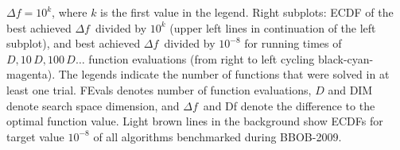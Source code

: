 \documentclass{sig-alternate}
\newcommand{\Df}{\ensuremath{\Delta f}}
\begin{document}
\begin{figure*}
{ $\Df=10^{k}$, where $k$ is the first value in the legend. Right subplots: ECDF of the best achieved \Df\ divided by $10^k$ (upper left
 lines in continuation of the left subplot), and best achieved \Df\
 divided by $10^{-8}$ for running times of $D, 10\,D,
 100\,D\dots$ function evaluations (from right
 to left cycling black-cyan-magenta).
 The legends indicate the number of functions that were solved in at
 least one trial. FEvals denotes number of function evaluations,
 $D$ and \textsf{DIM} denote search space dimension, and \Df\ and \textsf{Df} denote the difference to the optimal function value.
 Light brown lines in the background show ECDFs for target value $10^{-8}$ of all algorithms benchmarked during BBOB-2009.}
\end{figure*}
\end{document}
